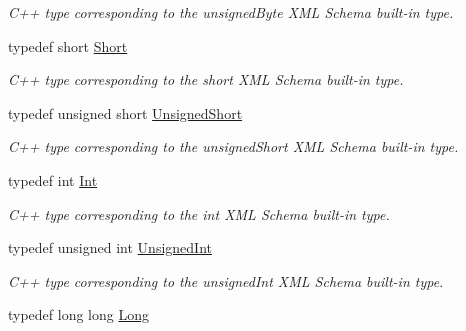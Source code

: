 \begin{DoxyCompactItemize}
\begin{DoxyCompactList}\small\item\em C++ type corresponding to the unsignedByte XML Schema built-\/in type. \item\end{DoxyCompactList}\item 
\hypertarget{namespacexml__schema_af32f275204ee102f0f2ebf36d8b2f81a}{
typedef short \hyperlink{namespacexml__schema_af32f275204ee102f0f2ebf36d8b2f81a}{Short}}
\label{namespacexml__schema_af32f275204ee102f0f2ebf36d8b2f81a}

\begin{DoxyCompactList}\small\item\em C++ type corresponding to the short XML Schema built-\/in type. \item\end{DoxyCompactList}\item 
\hypertarget{namespacexml__schema_ac717910ff9e59ceb377d5d108704a89a}{
typedef unsigned short \hyperlink{namespacexml__schema_ac717910ff9e59ceb377d5d108704a89a}{UnsignedShort}}
\label{namespacexml__schema_ac717910ff9e59ceb377d5d108704a89a}

\begin{DoxyCompactList}\small\item\em C++ type corresponding to the unsignedShort XML Schema built-\/in type. \item\end{DoxyCompactList}\item 
\hypertarget{namespacexml__schema_a12d975a13061c938969b2b5143e97645}{
typedef int \hyperlink{namespacexml__schema_a12d975a13061c938969b2b5143e97645}{Int}}
\label{namespacexml__schema_a12d975a13061c938969b2b5143e97645}

\begin{DoxyCompactList}\small\item\em C++ type corresponding to the int XML Schema built-\/in type. \item\end{DoxyCompactList}\item 
\hypertarget{namespacexml__schema_ac410e4eabf6080e99cc0fbfa10ee874f}{
typedef unsigned int \hyperlink{namespacexml__schema_ac410e4eabf6080e99cc0fbfa10ee874f}{UnsignedInt}}
\label{namespacexml__schema_ac410e4eabf6080e99cc0fbfa10ee874f}

\begin{DoxyCompactList}\small\item\em C++ type corresponding to the unsignedInt XML Schema built-\/in type. \item\end{DoxyCompactList}\item 
\hypertarget{namespacexml__schema_a516206ea7b60d1854f758b122bde2f5d}{
typedef long long \hyperlink{namespacexml__schema_a516206ea7b60d1854f758b122bde2f5d}{Long}}
\label{namespacexml__schema_a516206ea7b60d1854f758b122bde2f5d}


\end{DoxyCompactItemize}
